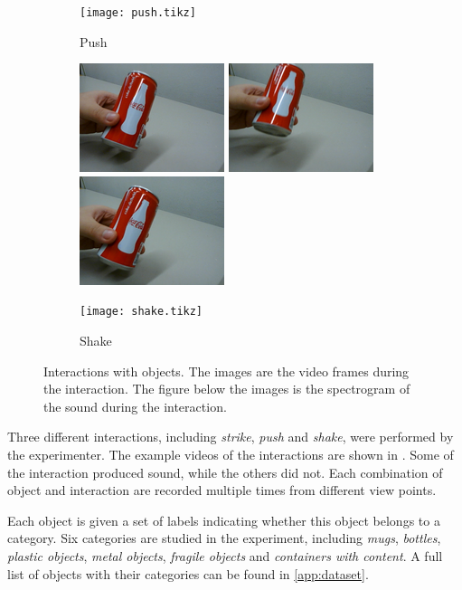 \documentclass[letterpaper, 10 pt, conference]{ieeeconf}  %
\begin{document}
\begin{figure}[t]
\begin{subfigure}[b]{.8\linewidth}
    \texttt{[image: push.tikz]}
    \caption{Push}
  \end{subfigure}

  \vspace{20pt}
  \begin{subfigure}[b]{.8\linewidth}
    \centering
    \includegraphics[width=.25\linewidth]{shake0} \hspace{.4cm}
    \includegraphics[width=.25\linewidth]{shake1} \hspace{.4cm}
    \includegraphics[width=.25\linewidth]{shake2}

    \texttt{[image: shake.tikz]}
    \caption{Shake}
  \end{subfigure}
  \caption[Interactions with objects.]{Interactions with objects. The images are the video frames during the interaction. The figure below the images is the spectrogram of the sound during the interaction.}
  \label{fig:interaction}
\end{figure}

Three different interactions, including \emph{strike}, \emph{push} and \emph{shake}, were performed by the experimenter. The example videos of the interactions are shown in . Some of the interaction produced sound, while the others did not. Each combination of object and interaction are recorded multiple times from different view points.

Each object is given a set of labels indicating whether this object belongs to a category. Six categories are studied in the experiment, including \emph{mugs}, \emph{bottles}, \emph{plastic objects}, \emph{metal objects}, \emph{fragile objects} and \emph{containers with content}.  
A full list of objects with their categories can be found in \cref{app:dataset}. 
\end{document}
